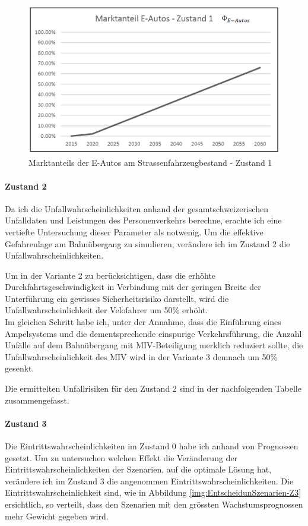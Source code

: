 \begin{figure}[h!]
	\centering
	\includegraphics[width=.6\textwidth]{figures/f-04-09-01-Marktanteil-E-Autos-Zustand-1}
	\caption[Marktanteil E-Autos - Zustand 1]{Marktanteils der E-Autos am Strassenfahrzeugbestand - Zustand 1}
	\label{img:Marktanteil-Z1}
\end{figure}


\paragraph{Zustand 2} Da ich die Unfallwahrscheinlichkeiten anhand der gesamtschweizerischen Unfalldaten und Leistungen des Personenverkehrs berechne, erachte ich eine vertiefte Untersuchung dieser Parameter als notwenig. Um die effektive Gefahrenlage am Bahnübergang zu simulieren, verändere ich im Zustand 2 die Unfallwahrscheinlichkeiten. 

Um in der Variante 2 zu berücksichtigen, dass die erhöhte Durchfahrtsgeschwindigkeit in Verbindung mit der geringen Breite der Unterführung ein gewisses Sicherheitsrisiko darstellt, wird die Unfallwahrscheinlichkeit der Velofahrer um 50\% erhöht. \\
Im gleichen Schritt habe ich, unter der Annahme, dass die Einführung eines Ampelsystems und die dementsprechende einspurige Verkehrsführung, die Anzahl Unfälle auf dem Bahnübergang mit MIV-Beteiligung merklich reduziert sollte, die Unfallwahrscheinlichkeit des MIV wird in der Variante 3 demnach um 50\% gesenkt. 

Die ermittelten Unfallrisiken für den Zustand 2 sind in der nachfolgenden Tabelle zusammengefasst. 



\paragraph{Zustand 3} Die Eintrittswahrscheinlichkeiten im Zustand 0 habe ich anhand von Prognossen gesetzt. Um zu untersuchen welchen Effekt die Veränderung der Eintrittswahrscheinlichkeiten der Szenarien, auf die optimale Lösung hat, verändere ich im Zustand 3 die angenommen Eintrittswahrscheinlichkeiten. Die Eintrittswahrscheinlichkeit sind, wie in Abbildung \ref{img:EntscheidunSzenarien-Z3} ersichtlich, so verteilt, dass den Szenarien mit den grössten Wachstumsprognossen mehr Gewicht gegeben wird. 

